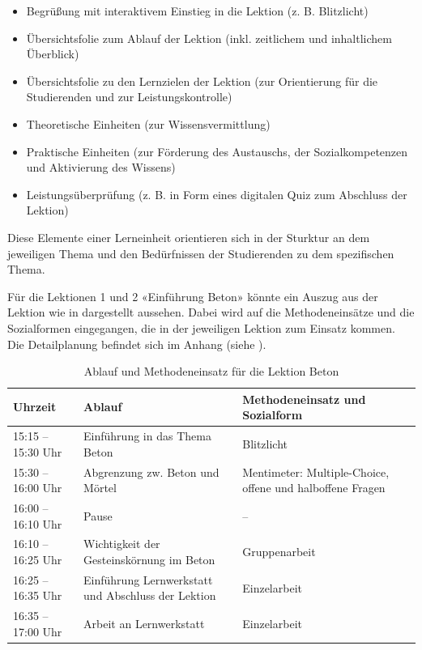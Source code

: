 \documentclass[
11pt,
captions=tableheading,
smallheadings,
headsepline,
footsepline, 
parskip=half-,
]{scrartcl}
\begin{document}
\begin{itemize}
    \item[\textrightarrow] Begrüßung mit interaktivem Einstieg in die Lektion (z. B. Blitzlicht)
    \item[\textrightarrow] Übersichtsfolie zum Ablauf der Lektion (inkl. zeitlichem und inhaltlichem Überblick)
    \item[\textrightarrow] Übersichtsfolie zu den Lernzielen der Lektion (zur Orientierung für die Studierenden und zur Leistungskontrolle)
    \item[\textrightarrow] Theoretische Einheiten (zur Wissensvermittlung)
    \item[\textrightarrow] Praktische Einheiten (zur Förderung des Austauschs, der Sozialkompetenzen und Aktivierung des Wissens)
    \item[\textrightarrow] Leistungsüberprüfung (z. B. in Form eines digitalen Quiz zum Abschluss der Lektion)
\end{itemize}
Diese Elemente einer Lerneinheit orientieren sich in der Sturktur an dem jeweiligen Thema und den Bedürfnissen der Studierenden zu dem spezifischen Thema. 


Für die Lektionen 1 und 2 «Einführung Beton» könnte ein Auszug aus der Lektion wie in  dargestellt aussehen. Dabei wird auf die Methodeneinsätze und die Sozialformen eingegangen, die in der jeweiligen Lektion zum Einsatz kommen.
Die Detailplanung befindet sich im Anhang (siehe ).
\begin{table}[h!tb]
    \centering
    \caption{Ablauf und Methodeneinsatz für die Lektion Beton}
    \begin{tabularx}{\textwidth}{@{}p{2.9cm}p{6.4cm}X@{}}
        \toprule
        \textbf{Uhrzeit} & \textbf{Ablauf} & \textbf{Methodeneinsatz und Sozialform} \\
        \midrule
        15:15 -- 15:30 Uhr & Einführung in das Thema Beton & Blitzlicht \\
        15:30 -- 16:00 Uhr & Abgrenzung zw. Beton und Mörtel & Mentimeter: Multiple-Choice, offene und halboffene Fragen \\
        16:00 -- 16:10 Uhr & Pause & -- \\
        16:10 -- 16:25 Uhr & Wichtigkeit der Gesteinskörnung im Beton & Gruppenarbeit \\
        16:25 -- 16:35 Uhr & Einführung Lernwerkstatt und Abschluss der Lektion & Einzelarbeit \\
        16:35 -- 17:00 Uhr & Arbeit an Lernwerkstatt & Einzelarbeit \\
        \bottomrule
    \end{tabularx}
    \label{tab:ablauf_beton}
\end{table}
\FloatBarrier
\end{document}
